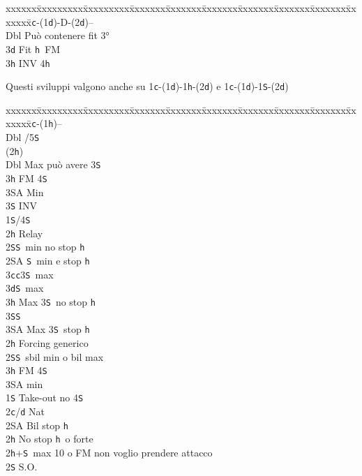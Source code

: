 \documentclass[a4paper,italian]{article}
\newcommand{\BS}{\small{\texttt{S}}}
\newcommand{\BC}{\small{\texttt{c}}}
\newcommand{\BD}{\small{\texttt{d}}}
\newcommand{\BH}{\small{\texttt{h}}}
\newenvironment{bidtable}
{\begin{tabbing}

    xxxxxx\=xxxxxxxxx\=xxxxxxxxx\=xxxxxxx\=xxxxxxx\=xxxxxxx\=xxxxxxx\=xxxxxxx\=xxxxxxx\=xxxxxxx\=\kill}
{\end{tabbing} }%
\newenvironment{sviluppi}
{\begin{tcolorbox}[colframe=azzurro,title=Sviluppi particolari]}
    {
\end{tcolorbox} }%
\begin{document}
\begin{multicols}{2}
    \begin{sviluppi}
        \begin{bidtable}
            1\BC-(1\BD)-D-(2\BD)--\+\\
            Dbl \> Può contenere fit 3°\\
            3\BD \> Fit \BH\ FM\\
            3\BH \> INV 4\BH \-
        \end{bidtable}
        \smallbreak
        Questi sviluppi valgono anche su 1\BC -(1\BD )-1\BH -(2\BD ) e 1\BC -(1\BD )-1\BS -(2\BD )
    \end{sviluppi}

    \begin{bidtable}
        1\BC-(1\BH)--\+\\
        Dbl /5\BS \+\\
        (2\BH)\+\\
        Dbl \> Max può avere 3\BS \\
        3\BH \> FM 4\BS \+\\
        3\small{SA} \> Min\-\\
        3\BS \> INV\-\\
        1\BS {}/4\BS \+\\
        2\BH \> Relay\+\\
        2\BS {}\BS\ min no stop \BH \\
        2\small{SA} \BS\ min e stop \BH \\
        3\BC {}\BC 3\BS\ max\\
        3\BD {}\BS\ max\\
        3\BH \> Max 3\BS\ no stop \BH \\
        3\BS {}\BS \\
        3\small{SA} \> Max 3\BS\ stop \BH \-\-\\
        2\BH \> Forcing generico\\
        2\BS {}\BS\ sbil min o bil max\\
        3\BH \> FM 4\BS \+\\
        3\small{SA} \> min\-\-\\
        1\BS \> Take-out no 4\BS \\
        2\BC/\BD \> Nat\+\\
        2\small{SA} \> Bil stop \BH \\
        2\BH \> No stop \BH\ o forte\-\\
        2\BH {}+\BS\ max 10 o FM non voglio prendere attacco\+\\
        2\BS \> S.O.\+\\

\end{bidtable}
\end{multicols}
\end{document}
